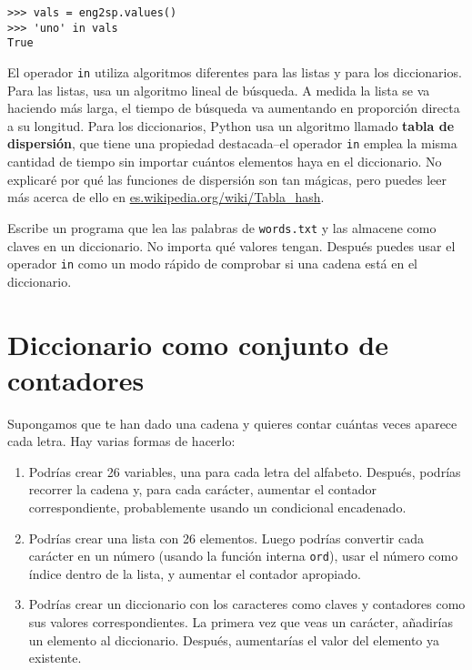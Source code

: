 
\beforeverb
\begin{verbatim}
>>> vals = eng2sp.values()
>>> 'uno' in vals
True
\end{verbatim}
\afterverb
%
El operador {\tt in} utiliza algoritmos diferentes para las listas y
para los diccionarios. Para las listas, usa un algoritmo lineal de búsqueda.
A medida la lista se va haciendo más larga, el tiempo de búsqueda
va aumentando en proporción directa a su longitud.
Para los diccionarios, Python usa un
algoritmo llamado {\bf tabla de dispersión}, que tiene una propiedad destacada--el
operador {\tt in} emplea la misma cantidad de tiempo sin importar cuántos
elementos haya en el diccionario. No explicaré
por qué las funciones de dispersión son tan mágicas,
pero puedes leer más acerca de ello en
\url{es.wikipedia.org/wiki/Tabla_hash}.


\begin{ex}
\label{wordlist2}


Escribe un programa que lea las palabras de {\tt words.txt} y
las almacene como claves en un diccionario. No importa qué
valores tengan. Después puedes usar el operador {\tt in}
como un modo rápido de comprobar si una cadena está en el
diccionario.

\end{ex}


\section{Diccionario como conjunto de contadores}
\label{histograma}


Supongamos que te han dado una cadena y quieres contar cuántas veces
aparece cada letra. Hay varias formas de hacerlo:

\begin{enumerate}

\item Podrías crear 26 variables, una para cada letra del
alfabeto. Después, podrías recorrer la cadena y, para cada
carácter, aumentar el contador correspondiente, probablemente
usando un condicional encadenado.

\item Podrías crear una lista con 26 elementos. Luego podrías
convertir cada carácter en un número (usando la función interna
{\tt ord}), usar el número como índice dentro de la lista, y aumentar
el contador apropiado.

\item Podrías crear un diccionario con los caracteres como claves
y contadores como sus valores correspondientes. La primera vez
que veas un carácter, añadirías un elemento al diccionario.
Después, aumentarías el valor del elemento ya existente.

\end{enumerate}

